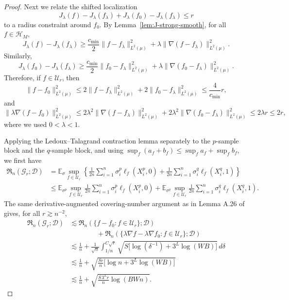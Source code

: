 \documentclass[11pt]{article}
\theoremstyle{plain}
\theoremstyle{definition}
\theoremstyle{remark}
\begin{document}
\begin{proof}
Next we relate the shifted localization
\[
J_\lambda(f)-J_\lambda(f_\lambda)
+
J_\lambda(f_0)-J_\lambda(f_\lambda)
\le r
\]
to a radius constraint around \(f_0\). By Lemma~\ref{lem:J-strong-smooth}, for all
\(f\in\mathcal H_M\),
\[
J_\lambda(f)-J_\lambda(f_\lambda)
\ge
\frac{c_{\min}}{2}
\|f-f_\lambda\|_{L^2(\mu)}^2
+
\lambda
\|\nabla(f-f_\lambda)\|_{L^2(\mu)}^2.
\]
Similarly,
\[
J_\lambda(f_0)-J_\lambda(f_\lambda)
\ge
\frac{c_{\min}}{2}
\|f_0-f_\lambda\|_{L^2(\mu)}^2
+
\lambda
\|\nabla(f_0-f_\lambda)\|_{L^2(\mu)}^2.
\]
Therefore, if \(f\in \mathcal U_r\), then
\[
\|f-f_0\|_{L^2(\mu)}^2
\le
2\|f-f_\lambda\|_{L^2(\mu)}^2
+
2\|f_0-f_\lambda\|_{L^2(\mu)}^2
\le
\frac{4}{c_{\min}}r,
\]
and
\[
\|\lambda\nabla(f-f_0)\|_{L^2(\mu)}^2
\le
2\lambda^2\|\nabla(f-f_\lambda)\|_{L^2(\mu)}^2
+
2\lambda^2\|\nabla(f_0-f_\lambda)\|_{L^2(\mu)}^2
\le
2\lambda r
\le
2r,
\]
where we used \(0<\lambda<1\).


Applying the Ledoux--Talagrand contraction lemma
\citep[Theorem~4.12]{ledoux1991probability}  separately to the
\(p\)-sample block and the \(q\)-sample block, and using
\(\sup_f(a_f+b_f)\le \sup_f a_f+\sup_f b_f\), we first have
\[
\begin{aligned}
\mathfrak R_n(\mathcal G_r;\mathcal D)
&=
\mathbb E_\sigma
\sup_{f\in \mathcal U_r}
\left\{
\frac{1}{2n}\sum_{i=1}^n\sigma_i^p \ell_f(X_i^p,0)
+
\frac{1}{2n}\sum_{i=1}^n\sigma_i^q \ell_f(X_i^q,1)
\right\} \\
&\le
\mathbb E_{\sigma^p}
\sup_{f\in \mathcal U_r}
\frac{1}{2n}\sum_{i=1}^n\sigma_i^p \ell_f(X_i^p,0)
+
\mathbb E_{\sigma^q}
\sup_{f\in \mathcal U_r}
\frac{1}{2n}\sum_{i=1}^n\sigma_i^q \ell_f(X_i^q,1).
\end{aligned}
\]
The same
derivative-augmented covering-number argument as in Lemma A.26 of
\cite{lu2021machine} gives, for all \(r\gtrsim n^{-2}\),
\[
\begin{aligned}
\mathfrak R_n(\mathcal G_r;\mathcal D)
&\lesssim
\mathfrak R_n\!\left(
\{f-f_0:f\in \mathcal U_r\};\mathcal D
\right) \\
&\qquad\qquad+
\mathfrak R_n\!\left(
\{\lambda\nabla f-\lambda\nabla f_0:
f\in \mathcal U_r\};\mathcal D
\right)\\
&\lesssim
\frac1n
+
\frac1{\sqrt n}
\int_{1/n}^{C\sqrt r}
\sqrt{
S\Big[
\log(\delta^{-1})+3^L\log(WB)
\Big]
}
\,d\delta\\
&\lesssim
\frac1n
+
\sqrt{
\frac{S r}{n}
\Big[
\log n+3^L\log(WB)
\Big]
}\\
&\lesssim
\frac1n
+
\sqrt{
\frac{S\,3^L r}{n}\log(BWn)
}.
\end{aligned}
\]



\end{proof}
\end{document}
